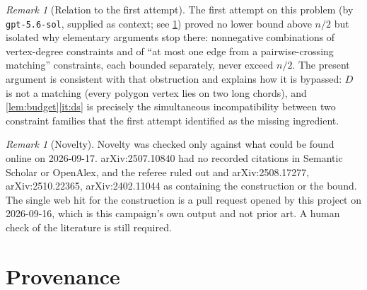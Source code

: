 \documentclass[11pt,a4paper]{article}
\theoremstyle{plain}
\theoremstyle{definition}
\theoremstyle{remark}
\newtheorem{remark}[theorem]{Remark}
\begin{document}
\begin{remark}[Relation to the first attempt]\label{rem:first}
The first attempt on this problem (by \texttt{gpt-5.6-sol}, supplied as context; see \cref{sec:provenance}) proved no lower bound above $n/2$ but isolated why elementary arguments stop there: nonnegative combinations of vertex-degree constraints and of ``at most one edge from a pairwise-crossing matching'' constraints, each bounded separately, never exceed $n/2$. The present argument is consistent with that obstruction and explains how it is bypassed: $D$ is not a matching (every polygon vertex lies on two long chords), and \cref{lem:budget}\ref{it:ds} is precisely the simultaneous incompatibility between two constraint families that the first attempt identified as the missing ingredient.
\end{remark}

\begin{remark}[Novelty]\label{rem:novelty}
Novelty was checked only against what could be found online on 2026-09-17. arXiv:2507.10840 had no recorded citations in Semantic Scholar or OpenAlex, and the referee ruled out \cite{OO21,AOO22,DP24,PSS23,AAB25} and arXiv:2508.17277, arXiv:2510.22365, arXiv:2402.11044 as containing the construction or the bound. The single web hit for the construction is a pull request opened by this project on 2026-09-16, which is this campaign's own output and not prior art. A human check of the literature is still required.
\end{remark}

\section{Provenance}\label{sec:provenance}
\end{document}
